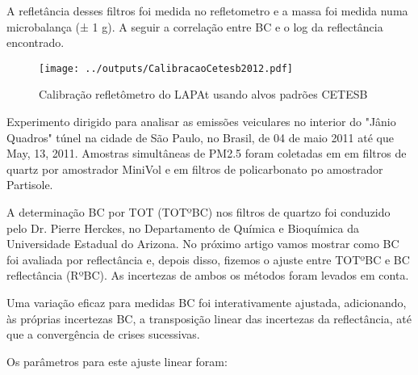 A refletância desses filtros foi medida no refletometro e a massa foi medida 
numa microbalança (± 1 g).
A seguir a correlação entre BC e o log da reflectância encontrado.

\begin{landscape}
\begin{figure}[H]
  \centering
  \texttt{[image: ../outputs/CalibracaoCetesb2012.pdf]}
  \caption{Calibração refletômetro do LAPAt usando alvos padrões CETESB}
\end{figure}
\end{landscape}

Experimento dirigido para analisar as emissões veiculares no interior do 
"Jânio Quadros" túnel na cidade de São Paulo, no Brasil, de 04 de maio 2011 
até que May, 13, 2011. Amostras simultâneas de PM2.5 foram coletadas em 
em filtros de quartz por amostrador MiniVol e em filtros de policarbonato 
po amostrador Partisole. 


A determinação BC por TOT (TOTºBC) nos filtros de quartzo foi conduzido pelo Dr. Pierre Herckes, no Departamento de Química e Bioquímica da Universidade Estadual do Arizona. No próximo artigo vamos mostrar como BC foi avaliada por reflectância e, depois disso, fizemos o ajuste entre TOTºBC e BC reflectância (RºBC). As incertezas de ambos os métodos foram levados em conta.




Uma variação eficaz para medidas BC foi interativamente ajustada, adicionando, às próprias incertezas BC, a transposição linear das incertezas da reflectância, até que a convergência de crises sucessivas.

Os parâmetros para este ajuste linear foram:


